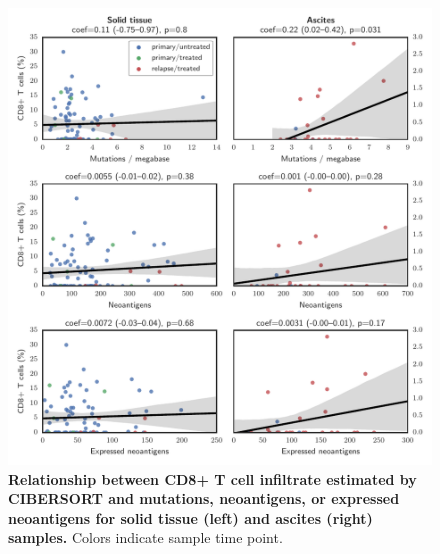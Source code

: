 \documentclass{article}
\begin{document}
\begin{figure}[htbp]
\centering
\includegraphics[scale=1.0]{../figures/cd8_vs_muts.pdf}
\caption{\textbf{Relationship between CD8+ T cell infiltrate estimated by CIBERSORT and mutations, neoantigens, or expressed neoantigens for solid tissue (left) and ascites (right) samples.} Colors indicate sample time point.}
\label{fig:cd8vsmuts}
\end{figure}
\end{document}
